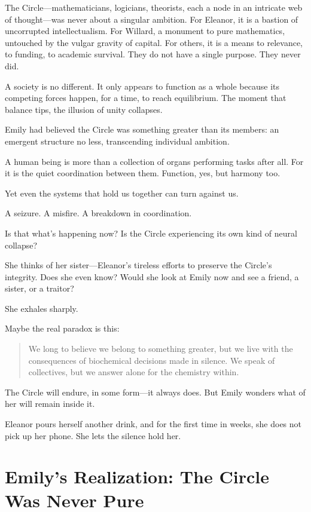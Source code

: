 The Circle—mathematicians, logicians, theorists, each a node in an intricate web of thought—was never about a singular ambition. For Eleanor, it is a bastion of uncorrupted intellectualism. For Willard, a monument to pure mathematics, untouched by the vulgar gravity of capital. For others, it is a means to relevance, to funding, to academic survival. They do not have a single purpose. They never did.

\smallskip

A society is no different. It only appears to function as a whole because its competing forces happen, for a time, to reach equilibrium. The moment that balance tips, the illusion of unity collapses.

Emily had believed the Circle was something greater than its members: an emergent structure no less, transcending individual ambition.

A human being is more than a collection of organs performing tasks after all. For it is the quiet coordination between them. Function, yes, but harmony too.

Yet even the systems that hold us together can turn against us.

A seizure. A misfire. A breakdown in coordination.

Is that what’s happening now?
Is the Circle experiencing its own kind of neural collapse?

\smallskip

She thinks of her sister—Eleanor’s tireless efforts to preserve the Circle’s integrity. Does she even know? Would she look at Emily now and see a friend, a sister, or a traitor?

She exhales sharply.

Maybe the real paradox is this:

\begin{quote}
We long to believe we belong to something greater, but we live with the consequences of biochemical decisions made in silence.
We speak of collectives, but we answer alone for the chemistry within.
\end{quote}

The Circle will endure, in some form—it always does. But Emily wonders what of her will remain inside it.

\smallskip

Eleanor pours herself another drink, and for the first time in weeks, she does not pick up her phone. She lets the silence hold her.
\section*{Emily’s Realization: The Circle Was Never Pure}

